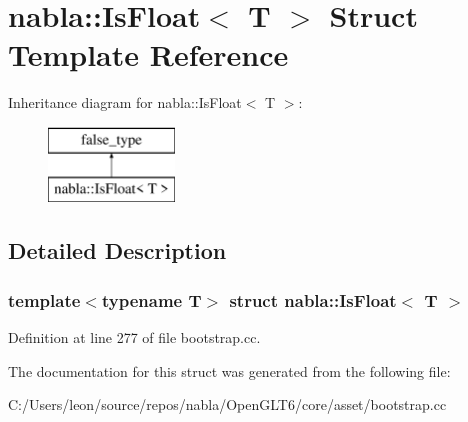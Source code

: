 \hypertarget{structnabla_1_1_is_float}{}\section{nabla\+::Is\+Float$<$ T $>$ Struct Template Reference}
\label{structnabla_1_1_is_float}
Inheritance diagram for nabla\+::Is\+Float$<$ T $>$\+:\begin{figure}[H]
\begin{center}
\leavevmode
\includegraphics[height=2.000000cm]{structnabla_1_1_is_float}
\end{center}
\end{figure}


\subsection{Detailed Description}
\subsubsection*{template$<$typename T$>$\newline
struct nabla\+::\+Is\+Float$<$ T $>$}



Definition at line 277 of file bootstrap.\+cc.



The documentation for this struct was generated from the following file\+:\begin{DoxyCompactItemize}
\item 
C\+:/\+Users/leon/source/repos/nabla/\+Open\+G\+L\+T6/core/asset/bootstrap.\+cc\end{DoxyCompactItemize}
